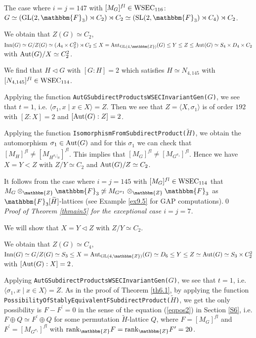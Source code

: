 \documentclass{amsart}
\theoremstyle{plain}
\theoremstyle{definition}
\theoremstyle{remark}
\newcommand{\bZ}{\mathbbm{Z}}\newcommand{\bQ}{\mathbbm{Q}}
\newcommand{\bF}{\mathbbm{F}}\newcommand{\bP}{\mathbbm{P}}
\newcommand{\GL}{{\rm GL}}\newcommand{\SL}{{\rm SL}}
\begin{document}
The case where $i=j=147$ with $[M_G]^{fl}\in {\rm WSEC}_{116}$: $G\simeq (\GL(2,\bF_3)\rtimes C_2)\rtimes C_2\simeq 
(\SL(2,\bF_3)\rtimes C_4)\rtimes C_2$. 

We obtain that $Z(G)\simeq C_2$, 
${\rm Inn}(G)\simeq G/Z(G)\simeq (A_4\times C_2^2)\rtimes C_2
\leq X={\rm Aut}_{\GL(4,\bZ)}(G)\leq 
Y\leq Z\leq {\rm Aut}(G)\simeq S_4\times D_4\times C_2$ 
with ${\rm Aut}(G)/X\simeq C_2^2$. 

We find that $H\lhd G$ with $[G:H]=2$ 
which satisfies $H\simeq N_{4,145}$ with $[N_{4,145}]^{fl}\in 
{\rm WSEC}_{114}$. 

Applying the function 
{\tt AutGSubdirectProductsWSECInvariantGen(}$G${\tt)}, 
we see that $t=1$, 
i.e. $\langle \sigma_1,x\mid x\in X\rangle=Z$. 
Then we see that $Z=\langle X,\sigma_1\rangle$ is of order $192$ 
with $[Z:X]=2$ and $[{\rm Aut}(G):Z]=2$. 

Applying the function 
{\tt IsomorphismFromSubdirectProduct($\widetilde{H}$}{\tt)}, 
we obtain the automorphism $\sigma_1\in {\rm Aut}(G)$ 
and for this $\sigma_1$ we can check that 
$[M_H]^{fl}\neq [M_{H^{\sigma_1|_H}}]^{fl}$. 
This implies that $[M_G]^{fl}\neq [M_{G^{\sigma_1}}]^{fl}$. 
Hence we have $X=Y<Z$ with $Z/Y\simeq C_2$ and ${\rm Aut}(G)/Z\simeq C_2$. 

It follows from the case 
where $i=j=145$ with $[M_G]^{fl}\in {\rm WSEC}_{114}$ that 
$M_G\otimes_\bZ \bF_3\not\simeq M_{G^{\sigma_1}}\otimes_\bZ \bF_3$ 
as $\bF_3[\widetilde{H}]$-lattices 
(see Example \ref{ex9.5} for GAP computations).\qed\\

{\it Proof of {Theorem \ref{thmain5}} for the exceptional case $i=j=7$.}

We will show that 
$X=Y\lhd Z$ with $Z/Y\simeq C_2$. 

We obtain that $Z(G)\simeq C_4$, 
${\rm Inn}(G)\simeq G/Z(G)\simeq S_3
\leq X={\rm Aut}_{\GL(4,\bZ)}(G)\simeq D_6\leq 
Y\leq Z\simeq {\rm Aut}(G)\simeq S_3\times C_2^2$ 
with $[{\rm Aut}(G):X]=2$.

Applying 
{\tt AutGSubdirectProductsWSECInvariantGen(}$G${\tt)}, 
we see that $t=1$, 
i.e. $\langle \sigma_1,x\mid x\in X\rangle=Z$. 
As in the proof of Theorem \ref{th6.1}, by applying the function 
{\tt PossibilityOfStablyEquivalentFSubdirectProduct($\widetilde{H}$)}, 
we get the only possibility is $F-F^\prime=0$ 
in the sense of the equation (\ref{eqpos2}) in Section \ref{S6}, 
i.e. $F\oplus Q\simeq F^\prime\oplus Q$ for some permutation 
$\widetilde{H}$-lattice $Q$, 
where $F=[M_G]^{fl}$ and $F^\prime=[M_{G^{\sigma_1}}]^{fl}$ 
with ${\rm rank}_\bZ F={\rm rank}_\bZ F^\prime=20$. 
\end{document}
